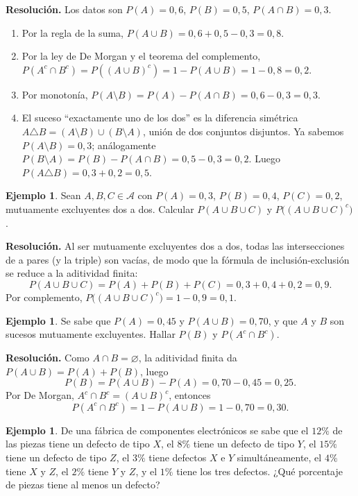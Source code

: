 \documentclass[11pt,a4paper]{article}
\theoremstyle{plain}
\theoremstyle{definition}
\newtheorem{ejemplo}[teorema]{Ejemplo}
\theoremstyle{remark}
\begin{document}
\textbf{Resolución.} Los datos son $P(A)=0{,}6$, $P(B)=0{,}5$, $P(A\cap B)=0{,}3$.
\begin{enumerate}
\item Por la regla de la suma, $P(A\cup B) = 0{,}6+0{,}5-0{,}3 = 0{,}8$.
\item Por la ley de De Morgan y el teorema del complemento, $P(A^c\cap B^c)=P((A\cup B)^c) = 1-P(A\cup B) = 1-0{,}8 = 0{,}2$.
\item Por monotonía, $P(A\setminus B) = P(A)-P(A\cap B) = 0{,}6-0{,}3 = 0{,}3$.
\item El suceso ``exactamente uno de los dos'' es la diferencia simétrica $A \triangle B = (A\setminus B)\cup(B\setminus A)$, unión de dos conjuntos disjuntos. Ya sabemos $P(A\setminus B)=0{,}3$; análogamente $P(B\setminus A) = P(B)-P(A\cap B) = 0{,}5-0{,}3=0{,}2$. Luego $P(A\triangle B) = 0{,}3+0{,}2 = 0{,}5$.
\end{enumerate}

\begin{ejemplo}
Sean $A,B,C\in\mathcal{A}$ con $P(A)=0{,}3$, $P(B)=0{,}4$, $P(C)=0{,}2$, mutuamente excluyentes dos a dos. Calcular $P(A\cup B\cup C)$ y $P\big((A\cup B\cup C)^c\big)$.
\end{ejemplo}

\textbf{Resolución.} Al ser mutuamente excluyentes dos a dos, todas las intersecciones de a pares (y la triple) son vacías, de modo que la fórmula de inclusión-exclusión se reduce a la aditividad finita:
\[
P(A\cup B\cup C) = P(A)+P(B)+P(C) = 0{,}3+0{,}4+0{,}2 = 0{,}9.
\]
Por complemento, $P\big((A\cup B\cup C)^c\big) = 1 - 0{,}9 = 0{,}1$.

\begin{ejemplo}
Se sabe que $P(A)=0{,}45$ y $P(A\cup B) = 0{,}70$, y que $A$ y $B$ son sucesos mutuamente excluyentes. Hallar $P(B)$ y $P(A^c \cap B^c)$.
\end{ejemplo}

\textbf{Resolución.} Como $A\cap B=\varnothing$, la aditividad finita da $P(A\cup B) = P(A)+P(B)$, luego
\[
P(B) = P(A\cup B)-P(A) = 0{,}70-0{,}45 = 0{,}25.
\]
Por De Morgan, $A^c\cap B^c = (A\cup B)^c$, entonces
\[
P(A^c\cap B^c) = 1-P(A\cup B) = 1-0{,}70=0{,}30.
\]

\begin{ejemplo}
De una fábrica de componentes electrónicos se sabe que el $12\%$ de las piezas tiene un defecto de tipo $X$, el $8\%$ tiene un defecto de tipo $Y$, el $15\%$ tiene un defecto de tipo $Z$, el $3\%$ tiene defectos $X$ e $Y$ simultáneamente, el $4\%$ tiene $X$ y $Z$, el $2\%$ tiene $Y$ y $Z$, y el $1\%$ tiene los tres defectos. ¿Qué porcentaje de piezas tiene al menos un defecto?
\end{ejemplo}
\end{document}
